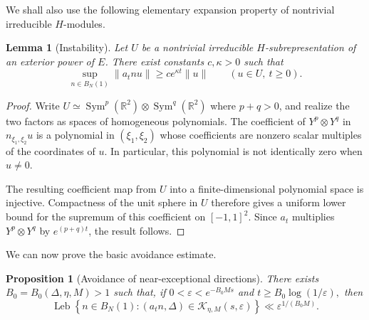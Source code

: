 \documentclass[reqno,11pt]{amsart}
\newtheorem{prop}[prop]{Proposition}
\newtheorem{lem}[lem]{Lemma}
\theoremstyle{definition}
\theoremstyle{remark}
\numberwithin{equation}{section}
\newcommand{\Leb}{\operatorname{Leb}}
\begin{document}
We shall also use the following elementary expansion property of
nontrivial irreducible $H$-modules.

\begin{lem}[Instability]
\label{lem:d2-instability}
Let $U$ be a nontrivial irreducible $H$-subrepresentation of an exterior
power of $E$. There exist constants $c,\kappa>0$ such that
$$
\sup_{n\in B_N(1)}\|a_tnu\|
\ge
ce^{\kappa t}\|u\|
\qquad
(u\in U,\ t\ge0).
$$
\end{lem}

\begin{proof}
Write
$
U
\simeq
\operatorname{Sym}^p(\mathbb R^2)
\otimes
\operatorname{Sym}^q(\mathbb R^2)$ where $p+q>0$,
and realize the two factors as spaces of homogeneous polynomials. The
coefficient of $Y^p\otimes Y^q$ in $n_{\xi_1,\xi_2}u$ is a polynomial in
$(\xi_1,\xi_2)$ whose coefficients are nonzero scalar multiples of the
coordinates of $u$. In particular, this polynomial is not identically zero
when $u\ne0$.

The resulting coefficient map from $U$ into a finite-dimensional
polynomial space is injective. Compactness of the unit sphere in $U$
therefore gives a uniform lower bound for the supremum of this coefficient
on $[-1,1]^2$. Since $a_t$ multiplies
$Y^p\otimes Y^q$ by $e^{(p+q)t}$, the result follows.
\end{proof}

We can now prove the basic avoidance estimate.

\begin{prop}[Avoidance of near-exceptional directions]
\label{prop:avoidance0}
There exists $B_0=B_0(\Delta,\eta,M)>1$ such that, if
$
0<\varepsilon<e^{-B_0Ms}$ and $
t\ge B_0\log(1/\varepsilon),
$
then
\begin{equation}\label{eq:d2-avoidance0}
\Leb\left\{
n\in B_N(1):
(a_tn,\Delta)\in\mathcal K_{\eta,M}(s,\varepsilon)
\right\}
\ll
\varepsilon^{1/(B_0M)}.
\end{equation}
\end{prop}
\end{document}
